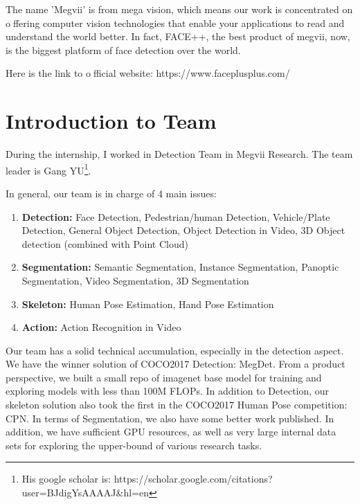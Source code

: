 The name ’Megvii’ is from mega vision, which means our work is concentrated on offering computer vision technologies that enable your applications to read and
understand the world better.
In fact, FACE++, the best product of megvii, now, is the biggest platform of face detection over the world.

Here is the link to official website: https://www.faceplusplus.com/


\section{Introduction to Team}
\label{sec:isauriam}

During the internship, I worked in Detection Team in Megvii Research.
The team leader is Gang YU\footnote{His google scholar is: https://scholar.google.com/citations?user=BJdigYsAAAAJ&hl=en}.

In general, our team is in charge of 4 main issues:
\begin{enumerate}
  \item{\textbf{Detection: }} Face Detection, Pedestrian/human Detection, Vehicle/Plate Detection, General Object Detection, Object Detection in Video, 3D Object detection (combined with Point Cloud)
  \item{\textbf{Segmentation: }} Semantic Segmentation, Instance Segmentation, Panoptic Segmentation, Video Segmentation, 3D Segmentation
  \item{\textbf{Skeleton: }} Human Pose Estimation, Hand Pose Estimation
  \item{\textbf{Action: }} Action Recognition in Video
\end{enumerate}

Our team has a solid technical accumulation, especially in the detection aspect. We have the winner solution of COCO2017 Detection:  MegDet\cite{peng2018megdet}.
From a product perspective, we built a small repo of imagenet base model for training and exploring models with less than 100M FLOPs.
In addition to Detection, our skeleton solution also took the first in the COCO2017 Human Pose competition: CPN\cite{chen2017cascaded}.
In terms of Segmentation, we also have some better work published. In addition, we have sufficient GPU resources, as well as very large internal data sets for exploring the upper-bound of various research tasks.




